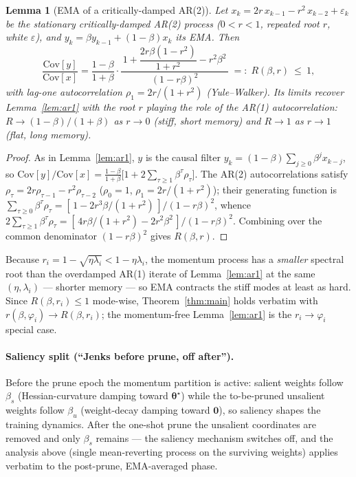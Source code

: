 \documentclass[11pt]{article}
\newtheorem{lemma}{Lemma}
\theoremstyle{remark}
\newcommand{\Cov}{\mathrm{Cov}}
\begin{document}
\begin{lemma}[EMA of a critically-damped AR(2)]
\label{lem:ar2}
Let $x_k=2r\,x_{k-1}-r^2\,x_{k-2}+\varepsilon_k$ be the stationary critically-damped
AR(2) process ($0<r<1$, repeated root $r$, white $\varepsilon$), and
$y_k=\beta y_{k-1}+(1-\beta)x_k$ its EMA. Then
\begin{equation}
\frac{\Cov[y]}{\Cov[x]}
=\frac{1-\beta}{1+\beta}\cdot
\frac{\,1+\dfrac{2r\beta(1-r^2)}{1+r^2}-r^2\beta^2\,}{(1-r\beta)^2}
\;=:\;R(\beta,r)\ \le\ 1,
\end{equation}
with lag-one autocorrelation $\rho_1=2r/(1+r^2)$ (Yule--Walker). Its limits recover
Lemma~\ref{lem:ar1} with the root $r$ playing the role of the AR(1) autocorrelation:
$R\to(1-\beta)/(1+\beta)$ as $r\to0$ (stiff, short memory) and $R\to1$ as $r\to1$
(flat, long memory).
\end{lemma}

\begin{proof}
As in Lemma~\ref{lem:ar1}, $y$ is the causal filter
$y_k=(1-\beta)\sum_{j\ge0}\beta^{j}x_{k-j}$, so
$\Cov[y]/\Cov[x]=\tfrac{1-\beta}{1+\beta}\bigl[1+2\sum_{\tau\ge1}\beta^{\tau}\rho_\tau\bigr]$.
The AR(2) autocorrelations satisfy $\rho_\tau=2r\rho_{\tau-1}-r^2\rho_{\tau-2}$
($\rho_0=1$, $\rho_1=2r/(1+r^2)$); their generating function is
$\sum_{\tau\ge0}\beta^{\tau}\rho_\tau=[\,1-2r^3\beta/(1+r^2)\,]/(1-r\beta)^2$, whence
$2\sum_{\tau\ge1}\beta^{\tau}\rho_\tau=[\,4r\beta/(1+r^2)-2r^2\beta^2\,]/(1-r\beta)^2$.
Combining over the common denominator $(1-r\beta)^2$ gives $R(\beta,r)$.
\end{proof}

Because $r_i=1-\sqrt{\eta\lambda_i}<1-\eta\lambda_i$, the momentum process has a
\emph{smaller} spectral root than the overdamped AR(1) iterate of
Lemma~\ref{lem:ar1} at the same $(\eta,\lambda_i)$ --- shorter memory --- so EMA
contracts the stiff modes at least as hard. Since $R(\beta,r_i)\le1$ mode-wise,
Theorem~\ref{thm:main} holds verbatim with $r(\beta,\varphi_i)\!\to\!R(\beta,r_i)$;
the momentum-free Lemma~\ref{lem:ar1} is the $r_i\!\to\!\varphi_i$ special case.

\paragraph{Saliency split (``Jenks before prune, off after'').}
Before the prune epoch the momentum partition is active: salient weights follow
$\beta_s$ (Hessian-curvature damping toward $\bm\theta^\star$) while the
to-be-pruned unsalient weights follow $\beta_u$ (weight-decay damping toward
$\bm 0$), so saliency shapes the training dynamics. After the one-shot prune the
unsalient coordinates are removed and only $\beta_s$ remains --- the saliency
mechanism switches off, and the analysis above (single mean-reverting process on
the surviving weights) applies verbatim to the post-prune, EMA-averaged phase.
\end{document}
